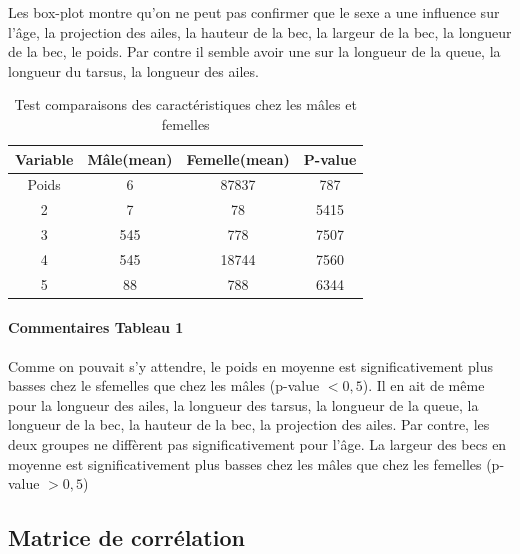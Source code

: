 \documentclass[12pt, twocolumn]{article}
\begin{document}
Les box-plot montre qu'on ne peut pas confirmer que le sexe a une influence sur l'âge, la projection des ailes, la hauteur de la bec, la largeur de la bec, la longueur de la bec, le poids.
Par contre il semble avoir une sur la longueur de la queue, la longueur du tarsus, la longueur des ailes.

\begin{table}[h!]
    \centering
    \begin{tabular}{||c c c c||} 
     \hline
     Variable & Mâle(mean) & Femelle(mean) & P-value \\ [0.5ex] 
     \hline\hline
     Poids & 6 & 87837 & 787 \\ 
     2 & 7 & 78 & 5415 \\
     3 & 545 & 778 & 7507 \\
     4 & 545 & 18744 & 7560 \\
     5 & 88 & 788 & 6344 \\ [0.5ex] 
     \hline
    \end{tabular}
    \caption{Test comparaisons des caractéristiques chez les mâles et femelles}
    \label{table:1}
\end{table}


\paragraph{Commentaires Tableau 1}
Comme on pouvait s'y attendre, le poids en moyenne est significativement plus basses chez le sfemelles que chez les mâles (p-value $< 0,5$).
Il en ait de même pour la longueur des ailes, la longueur des tarsus, la longueur de la queue, la longueur de la bec, la hauteur de la bec, la projection des ailes.
Par contre, les deux groupes ne diffèrent pas significativement pour l'âge. La largeur des becs en moyenne est significativement plus basses chez les mâles que chez les femelles (p-value $> 0,5$)

\newpage

\subsection{Matrice de corrélation}
\end{document}
